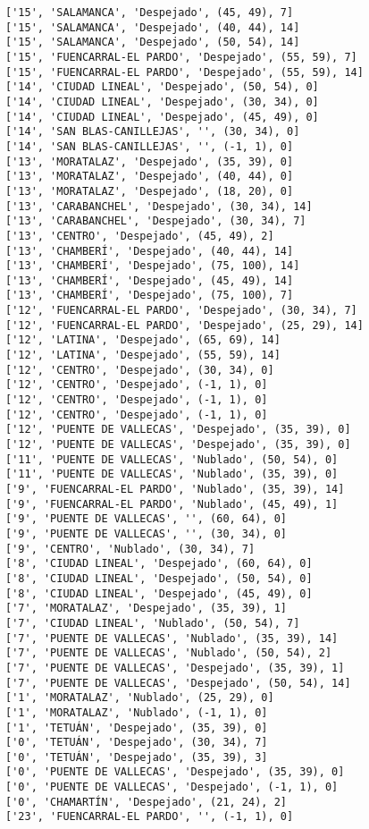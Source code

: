 \documentclass[11pt]{article}
\begin{document}
\begin{Verbatim}[commandchars=\\\{\}]
['15', 'SALAMANCA', 'Despejado', (45, 49), 7]
['15', 'SALAMANCA', 'Despejado', (40, 44), 14]
['15', 'SALAMANCA', 'Despejado', (50, 54), 14]
['15', 'FUENCARRAL-EL PARDO', 'Despejado', (55, 59), 7]
['15', 'FUENCARRAL-EL PARDO', 'Despejado', (55, 59), 14]
['14', 'CIUDAD LINEAL', 'Despejado', (50, 54), 0]
['14', 'CIUDAD LINEAL', 'Despejado', (30, 34), 0]
['14', 'CIUDAD LINEAL', 'Despejado', (45, 49), 0]
['14', 'SAN BLAS-CANILLEJAS', '', (30, 34), 0]
['14', 'SAN BLAS-CANILLEJAS', '', (-1, 1), 0]
['13', 'MORATALAZ', 'Despejado', (35, 39), 0]
['13', 'MORATALAZ', 'Despejado', (40, 44), 0]
['13', 'MORATALAZ', 'Despejado', (18, 20), 0]
['13', 'CARABANCHEL', 'Despejado', (30, 34), 14]
['13', 'CARABANCHEL', 'Despejado', (30, 34), 7]
['13', 'CENTRO', 'Despejado', (45, 49), 2]
['13', 'CHAMBERÍ', 'Despejado', (40, 44), 14]
['13', 'CHAMBERÍ', 'Despejado', (75, 100), 14]
['13', 'CHAMBERÍ', 'Despejado', (45, 49), 14]
['13', 'CHAMBERÍ', 'Despejado', (75, 100), 7]
['12', 'FUENCARRAL-EL PARDO', 'Despejado', (30, 34), 7]
['12', 'FUENCARRAL-EL PARDO', 'Despejado', (25, 29), 14]
['12', 'LATINA', 'Despejado', (65, 69), 14]
['12', 'LATINA', 'Despejado', (55, 59), 14]
['12', 'CENTRO', 'Despejado', (30, 34), 0]
['12', 'CENTRO', 'Despejado', (-1, 1), 0]
['12', 'CENTRO', 'Despejado', (-1, 1), 0]
['12', 'CENTRO', 'Despejado', (-1, 1), 0]
['12', 'PUENTE DE VALLECAS', 'Despejado', (35, 39), 0]
['12', 'PUENTE DE VALLECAS', 'Despejado', (35, 39), 0]
['11', 'PUENTE DE VALLECAS', 'Nublado', (50, 54), 0]
['11', 'PUENTE DE VALLECAS', 'Nublado', (35, 39), 0]
['9', 'FUENCARRAL-EL PARDO', 'Nublado', (35, 39), 14]
['9', 'FUENCARRAL-EL PARDO', 'Nublado', (45, 49), 1]
['9', 'PUENTE DE VALLECAS', '', (60, 64), 0]
['9', 'PUENTE DE VALLECAS', '', (30, 34), 0]
['9', 'CENTRO', 'Nublado', (30, 34), 7]
['8', 'CIUDAD LINEAL', 'Despejado', (60, 64), 0]
['8', 'CIUDAD LINEAL', 'Despejado', (50, 54), 0]
['8', 'CIUDAD LINEAL', 'Despejado', (45, 49), 0]
['7', 'MORATALAZ', 'Despejado', (35, 39), 1]
['7', 'CIUDAD LINEAL', 'Nublado', (50, 54), 7]
['7', 'PUENTE DE VALLECAS', 'Nublado', (35, 39), 14]
['7', 'PUENTE DE VALLECAS', 'Nublado', (50, 54), 2]
['7', 'PUENTE DE VALLECAS', 'Despejado', (35, 39), 1]
['7', 'PUENTE DE VALLECAS', 'Despejado', (50, 54), 14]
['1', 'MORATALAZ', 'Nublado', (25, 29), 0]
['1', 'MORATALAZ', 'Nublado', (-1, 1), 0]
['1', 'TETUÁN', 'Despejado', (35, 39), 0]
['0', 'TETUÁN', 'Despejado', (30, 34), 7]
['0', 'TETUÁN', 'Despejado', (35, 39), 3]
['0', 'PUENTE DE VALLECAS', 'Despejado', (35, 39), 0]
['0', 'PUENTE DE VALLECAS', 'Despejado', (-1, 1), 0]
['0', 'CHAMARTÍN', 'Despejado', (21, 24), 2]
['23', 'FUENCARRAL-EL PARDO', '', (-1, 1), 0]

\end{Verbatim}
\end{document}
